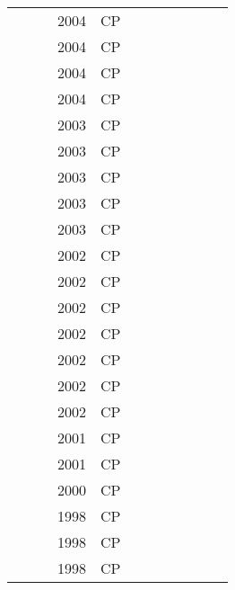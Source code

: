 \documentclass[a4paper]{article}
\begin{document}
{\begin{longtable}{p{3cm}p{6cm}rrcrlcccp{1.5cm}l}
& \href{papers/VilimBC04.pdf}{} & \cite{VilimBC04} & 2004 & CP & & & & & & & \\
& \href{papers/Hooker04.pdf}{} & \cite{Hooker04} & 2004 & CP & & & & & & & \\
& \href{papers/KovacsV04.pdf}{} & \cite{KovacsV04} & 2004 & CP & & & & & & & \\
& \href{papers/LimRX04.pdf}{} & \cite{LimRX04} & 2004 & CP & & & & & & & \\
& \href{papers/OddiPCC03.pdf}{} & \cite{OddiPCC03} & 2003 & CP & & & & & & & \\
& \href{papers/Kumar03.pdf}{} & \cite{Kumar03} & 2003 & CP & & & & & & & \\
& \href{papers/Wolf03.pdf}{} & \cite{Wolf03} & 2003 & CP & & & & & & & \\
& \href{papers/DannaP03.pdf}{} & \cite{DannaP03} & 2003 & CP & & & & & & & \\
& \href{papers/Vilim03.pdf}{} & \cite{Vilim03} & 2003 & CP & & & & & & & \\
& \href{papers/BeldiceanuC02.pdf}{} & \cite{BeldiceanuC02} & 2002 & CP & & & & & & & \\
& \href{papers/Muscettola02.pdf}{} & \cite{Muscettola02} & 2002 & CP & & & & & & & \\
& \href{papers/KamarainenS02.pdf}{} & \cite{KamarainenS02} & 2002 & CP & & & & & & & \\
& \href{papers/Bartak02.pdf}{} & \cite{Bartak02} & 2002 & CP & & & & & & & \\
& \href{papers/HookerY02.pdf}{} & \cite{HookerY02} & 2002 & CP & & & & & & & \\
& \href{papers/ElkhyariGJ02.pdf}{} & \cite{ElkhyariGJ02} & 2002 & CP & & & & & & & \\
& \href{papers/Vilim02.pdf}{} & \cite{Vilim02} & 2002 & CP & & & & & & & \\
& \href{papers/VerfaillieL01.pdf}{} & \cite{VerfaillieL01} & 2001 & CP & & & & & & & \\
& \href{papers/VanczaM01.pdf}{} & \cite{VanczaM01} & 2001 & CP & & & & & & & \\
& \href{papers/AngelsmarkJ00.pdf}{} & \cite{AngelsmarkJ00} & 2000 & CP & & & & & & & \\
& \href{papers/RodosekW98.pdf}{} & \cite{RodosekW98} & 1998 & CP & & & & & & & \\
& \href{papers/CestaOS98.pdf}{} & \cite{CestaOS98} & 1998 & CP & & & & & & & \\
& \href{papers/FrostD98.pdf}{} & \cite{FrostD98} & 1998 & CP & & & & & & & \\

\end{longtable}}
\end{document}
